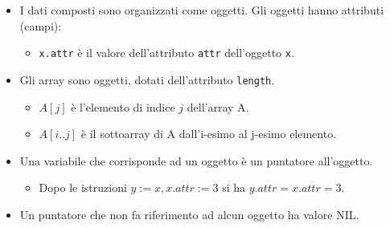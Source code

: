 \begin{itemize}
    \item I dati composti sono organizzati come oggetti. Gli oggetti hanno attributi (campi):
    \begin{itemize}
        \item \texttt{x.attr} è il valore dell'attributo \texttt{attr} dell'oggetto \texttt{x}.
    \end{itemize}
    \item Gli array sono oggetti, dotati dell'attributo \texttt{length}.
    \begin{itemize}
        \item \(A[j]\) è l'elemento di indice \(j\) dell'array A.
        \item \(A[i..j]\) è il sottoarray di A dall'i-esimo al j-esimo elemento.
    \end{itemize}
    \item Una variabile che corrisponde ad un oggetto è un puntatore all'oggetto.
    \begin{itemize}
        \item Dopo le istruzioni \( y := x, x.attr := 3 \) si ha \( y.attr = x.attr = 3 \).
    \end{itemize}
    \item Un puntatore che non fa riferimento ad alcun oggetto ha valore NIL.
\end{itemize}